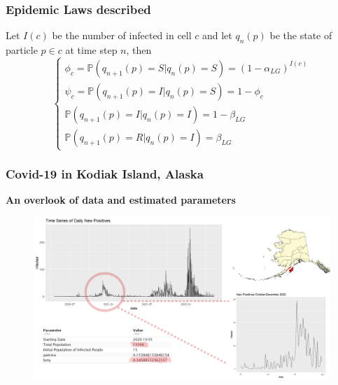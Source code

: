 \documentclass[usenames,dvipsnames]{beamer}
\newcommand{\deftitle}[1]{\color{darkred}\bf{#1}\color{black}}
\newcommand{\dftitle}[2]{\color{#2}\bf{#1}\color{black}}
\newcommand{\p}{\mathbb{P}}
\begin{document}
\begin{frame}
\frametitle{Epidemic Laws described}
\centering
\begin{theorem}
Let $I(c)$ be the number of infected in cell $c$ and let $q_n(p)$ be the state of particle $p \in c$ at time step $n$, then
\[
\begin{cases}
	 \phi_c=\p\left(q_{n+1}(p)=S |q_{n}(p)=S\right)=(1-\alpha_{LG})^{I(c)} \\
     \psi_c=\p\left(q_{n+1}(p)=I |q_{n}(p)=S\right)=1-\phi_c\\
     \p\left(q_{n+1}(p)=I |q_{n}(p)=I\right)=1-\beta_{LG} \\
     \p\left(q_{n+1}(p)=R |q_{n}(p)=I\right)=\beta_{LG}
\end{cases}
\]
\end{theorem}
\end{frame}


\begin{frame}
	\frametitle{Covid-19 in Kodiak Island, Alaska}
\begin{center}
	\dftitle{An overlook of data and estimated parameters}{Bittersweet}
\end{center}
	\begin{figure}
		\includegraphics[width=0.93\linewidth]{covid_glob.png}
	\end{figure}

\end{frame}
\end{document}
